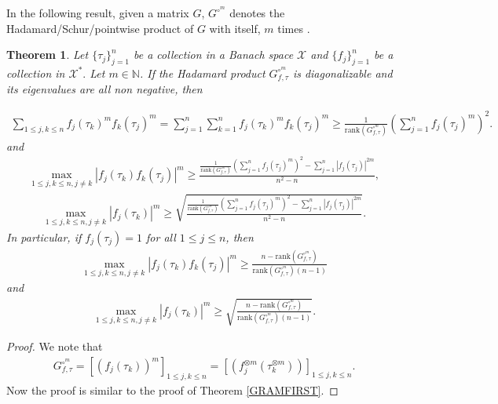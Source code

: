 \documentclass{amsart}
\newtheorem{theorem}{Theorem}[section]
\begin{document}
In the following result, given a matrix $G$,  $G^{\circ^m}$ denotes the Hadamard/Schur/pointwise product of $G$ with itself, $m$ times \cite{HORNHADAMARD}.
\begin{theorem}
Let $\{\tau_j\}_{j=1}^n$ be a collection in a  Banach space $\mathcal{X}$  and 	$\{f_j\}_{j=1}^n$ be a collection in  $\mathcal{X}^*.$ Let $m\in \mathbb{N}$. If the Hadamard product  $G_{f,\tau}^{\circ^m}$ is diagonalizable and its eigenvalues are all non negative, then 

\begin{align*}
	\sum_{1\leq j,k \leq n }f_j(\tau_k)^mf_k(\tau_j)^m=\sum_{j=1}^n\sum_{k=1}^nf_j(\tau_k)^mf_k(\tau_j)^m\geq \frac{1}{\text{rank}(G_{f,\tau}^{\circ^m})}	\left(\sum_{j=1}^n
	f_j(\tau_j)^m\right)^2.
\end{align*}
and 
\begin{align*}
	\max _{1\leq j,k \leq n, j\neq k}|f_j(\tau_k)f_k(\tau_j)|^m\geq \frac{\frac{1}{\text{rank}(G_{f,\tau}^{\circ^m})}	\left(\sum_{j=1}^n
		f_j(\tau_j)^m\right)^2-	\sum_{j=1}^n
		|f_j(\tau_j)|^{2m}}{n^2-n},
\end{align*}
\begin{align*}
	\max _{1\leq j,k \leq n, j\neq k}|f_j(\tau_k)|^m\geq \sqrt{\frac{\frac{1}{\text{rank}(G_{f,\tau}^{\circ^m})}	\left(\sum_{j=1}^n
			f_j(\tau_j)^m\right)^2-	\sum_{j=1}^n
			|f_j(\tau_j)|^{2m}}{n^2-n}}.
\end{align*}
In particular, if $f_j(\tau_j)=1$ for all $1\leq j \leq n$, then 
\begin{align*}
	\max _{1\leq j,k \leq n, j\neq k}|f_j(\tau_k)f_k(\tau_j)|^m\geq \frac{n-\text{rank}(G_{f,\tau}^{\circ^m})}{\text{rank}(G_{f,\tau}^{\circ^m})(n-1)}
\end{align*}
and 
\begin{align*}
	\max _{1\leq j,k \leq n, j\neq k}|f_j(\tau_k)|^m\geq \sqrt{\frac{n-\text{rank}(G_{f,\tau}^{\circ^m})}{\text{rank}(G_{f,\tau}^{\circ^m})(n-1)}}.
\end{align*}		
\end{theorem}
\begin{proof}
	We note that 
	\begin{align*}
	G_{f,\tau}^{\circ^m}=[(f_j(\tau_k))^m]_{1\leq j,k \leq n}=[(f_j^{\otimes m}(\tau^{\otimes m}_k))]_{1\leq j,k \leq n}.
	\end{align*}
Now the proof is similar to the proof of Theorem \ref{GRAMFIRST}.
\end{proof}
\end{document}

